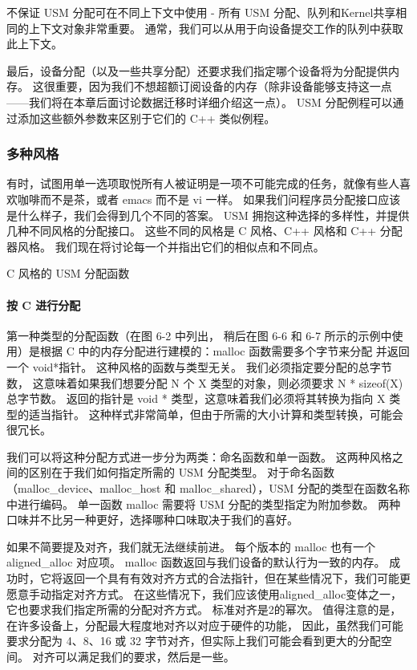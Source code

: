 不保证 USM 分配可在不同上下文中使用 - 所有 USM 分配、队列和Kernel共享相同的上下文对象非常重要。 
通常，我们可以从用于向设备提交工作的队列中获取此上下文。

最后，设备分配（以及一些共享分配）还要求我们指定哪个设备将为分配提供内存。 
这很重要，因为我们不想超额订阅设备的内存（除非设备能够支持这一点——我们将在本章后面讨论数据迁移时详细介绍这一点）。 
USM 分配例程可以通过添加这些额外参数来区别于它们的 C++ 类似例程。

\subsubsection{多种风格}
有时，试图用单一选项取悦所有人被证明是一项不可能完成的任务，就像有些人喜欢咖啡而不是茶，或者 emacs 而不是 vi 一样。 
如果我们问程序员分配接口应该是什么样子，我们会得到几个不同的答案。 
USM 拥抱这种选择的多样性，并提供几种不同风格的分配接口。 
这些不同的风格是 C 风格、C++ 风格和 C++ 分配器风格。 我们现在将讨论每一个并指出它们的相似点和不同点。

{\color{red} C 风格的 USM 分配函数}

\paragraph{按 C 进行分配}

第一种类型的分配函数（在图 6-2 中列出，
稍后在图 6-6 和 6-7 所示的示例中使用）是根据 C 中的内存分配进行建模的：malloc 函数需要多个字节来分配
并返回一个 void*指针。 这种风格的函数与类型无关。 我们必须指定要分配的总字节数，
这意味着如果我们想要分配 N 个 X 类型的对象，则必须要求 N * sizeof(X) 总字节数。 
返回的指针是 void * 类型，这意味着我们必须将其转换为指向 X 类型的适当指针。
这种样式非常简单，但由于所需的大小计算和类型转换，可能会很冗长。

我们可以将这种分配方式进一步分为两类：命名函数和单一函数。 这两种风格之间的区别在于我们如何指定所需的 USM 分配类型。 
对于命名函数（malloc\_device、malloc\_host 和 malloc\_shared），USM 分配的类型在函数名称中进行编码。 
单一函数 malloc 需要将 USM 分配的类型指定为附加参数。 两种口味并不比另一种更好，选择哪种口味取决于我们的喜好。

如果不简要提及对齐，我们就无法继续前进。 每个版本的 malloc 也有一个aligned\_alloc 对应项。 
malloc 函数返回与我们设备的默认行为一致的内存。 
成功时，它将返回一个具有有效对齐方式的合法指针，但在某些情况下，我们可能更愿意手动指定对齐方式。 
在这些情况下，我们应该使用aligned\_alloc变体之一，它也要求我们指定所需的分配对齐方式。 
标准对齐是2的幂次。 值得注意的是，在许多设备上，分配最大程度地对齐以对应于硬件的功能，
因此，虽然我们可能要求分配为 4、8、16 或 32 字节对齐，但实际上我们可能会看到更大的分配空间。 
对齐可以满足我们的要求，然后是一些。

